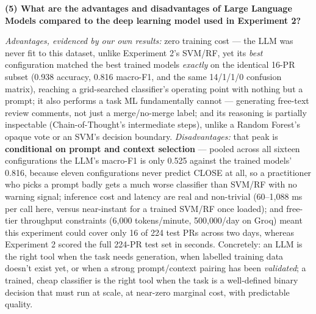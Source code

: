 \documentclass{experimentreport}
\begin{document}
{\textbf{(5) What are the advantages and disadvantages of Large Language Models compared to the deep
learning model used in Experiment 2?}

\emph{Advantages, evidenced by our own results:} zero training cost --- the LLM was never fit to this
dataset, unlike Experiment 2's SVM/RF, yet its \emph{best} configuration matched the best trained
models \emph{exactly} on the identical 16-PR subset (0.938 accuracy, 0.816 macro-F1, and the same
14/1/1/0 confusion matrix), reaching a grid-searched classifier's operating point with nothing but a
prompt; it also performs a task ML fundamentally cannot --- generating free-text review comments,
not just a merge/no-merge label; and its reasoning is partially inspectable (Chain-of-Thought's
intermediate steps), unlike a Random Forest's opaque vote or an SVM's decision boundary.
\emph{Disadvantages:} that peak is \textbf{conditional on prompt and context selection} --- pooled
across all sixteen configurations the LLM's macro-F1 is only 0.525 against the trained models' 0.816,
because eleven configurations never predict CLOSE at all, so a practitioner who picks a prompt
badly gets a much worse classifier than SVM/RF with no warning signal; inference cost and latency
are real and non-trivial (60--1{,}088 ms per call here, versus near-instant for a trained SVM/RF once
loaded); and free-tier throughput constraints (6{,}000 tokens/minute, 500{,}000/day on Groq) meant
this experiment could cover only 16 of 224 test PRs across two days, whereas Experiment 2 scored the
full 224-PR test set in seconds. Concretely: an LLM is the right tool when the task needs generation,
when labelled training data doesn't exist yet, or when a strong prompt/context pairing has been
\emph{validated}; a trained, cheap classifier is the right tool when the task is a well-defined
binary decision that must run at scale, at near-zero marginal cost, with predictable quality.

}


\teachercomment
\end{document}
